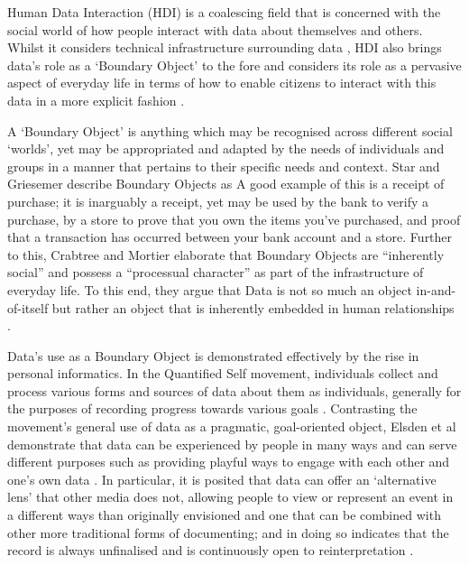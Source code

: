 Human Data Interaction (HDI) is a coalescing field that is concerned with the social world of how people interact with data about themselves and others. Whilst it considers technical infrastructure surrounding data \cite{mcauley_dataware_2011}, HDI also brings data's role as a `Boundary Object' \cite{star_institutional_1989} to the fore and considers its role as a pervasive aspect of everyday life in terms of how to enable citizens to interact with this data in a more explicit fashion \cite{mortier_human-data_2014}.

A `Boundary Object' is anything which may be recognised across different social `worlds', yet may be appropriated and adapted by the needs of individuals and groups in a manner that pertains to their specific needs and context. Star and Griesemer describe Boundary Objects as  \cite{star_institutional_1989} A good example of this is a receipt of purchase; it is inarguably a receipt, yet may be used by the bank to verify a purchase, by a store to prove that you own the items you've purchased, and proof that a transaction has occurred between your bank account and a store. Further to this, Crabtree and Mortier elaborate that Boundary Objects are ``inherently social'' and possess a ``processual character'' as part of the infrastructure of everyday life. To this end, they argue that Data is not so much an object in-and-of-itself but rather an object that is inherently embedded in human relationships \cite{crabtree_human_2015}.

Data's use as a Boundary Object is demonstrated effectively by the rise in personal informatics. In the Quantified Self movement, individuals collect and process various forms and sources of data about them as individuals, generally for the purposes of recording progress towards various goals \cite{swan_emerging_2009, swan_quantified_2013}. Contrasting the movement's general use of data as a pragmatic, goal-oriented object, Elsden et al demonstrate that data can be experienced by people in many ways and can serve different purposes such as providing playful ways to engage with each other and one's own data \cite{elsden_quantified_2014, elsden_metadating:_2016}. In particular, it is posited that data can offer an `alternative lens' that other media does not, allowing people to view or represent an event in a different ways than originally envisioned and one that can be combined with other more traditional forms of documenting; and in doing so indicates that the record is always unfinalised and is continuously open to reinterpretation \cite{elsden_designing_2017}.

